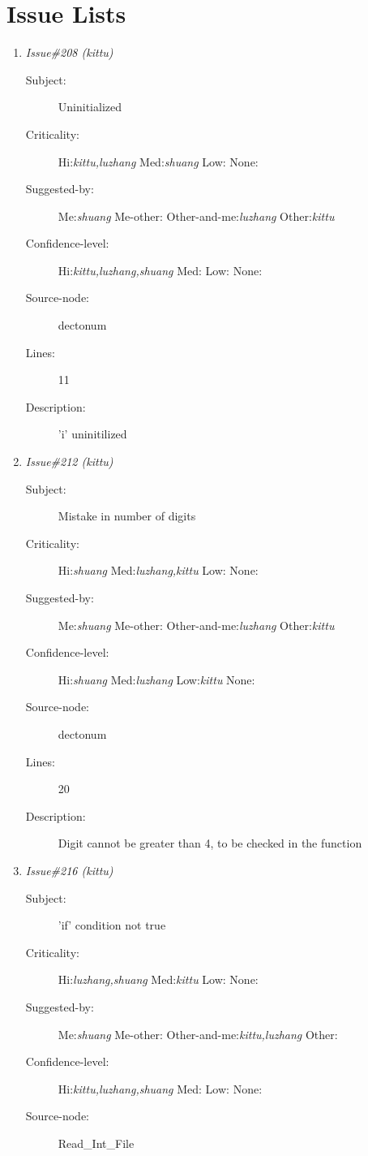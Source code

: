 \section{Issue Lists}
\begin{enumerate}
\item {\it Issue\#208 (kittu)}
\begin{description}
\item [Subject:] Uninitialized
\item [Criticality:] Hi:{\it kittu,luzhang} Med:{\it shuang} Low:{\it } None:{\it }
\item [Suggested-by:] Me:{\it shuang} Me-other:{\it } Other-and-me:{\it luzhang} Other:{\it kittu}
\item [Confidence-level:] Hi:{\it kittu,luzhang,shuang} Med:{\it } Low:{\it } None:{\it }
\item [Source-node:] dectonum

\item [Lines:] 11

\item [Description:] 'i' uninitilized
\end{description}
\item {\it Issue\#212 (kittu)}
\begin{description}
\item [Subject:] Mistake in number of digits
\item [Criticality:] Hi:{\it shuang} Med:{\it luzhang,kittu} Low:{\it } None:{\it }
\item [Suggested-by:] Me:{\it shuang} Me-other:{\it } Other-and-me:{\it luzhang} Other:{\it kittu}
\item [Confidence-level:] Hi:{\it shuang} Med:{\it luzhang} Low:{\it kittu} None:{\it }
\item [Source-node:] dectonum

\item [Lines:] 20

\item [Description:] Digit cannot be greater than 4, to be checked in
the function
\end{description}
\item {\it Issue\#216 (kittu)}
\begin{description}
\item [Subject:] 'if' condition not true
\item [Criticality:] Hi:{\it luzhang,shuang} Med:{\it kittu} Low:{\it } None:{\it }
\item [Suggested-by:] Me:{\it shuang} Me-other:{\it } Other-and-me:{\it kittu,luzhang} Other:{\it }
\item [Confidence-level:] Hi:{\it kittu,luzhang,shuang} Med:{\it } Low:{\it } None:{\it }
\item [Source-node:] Read\_Int\_File


\end{description}
\end{enumerate}
